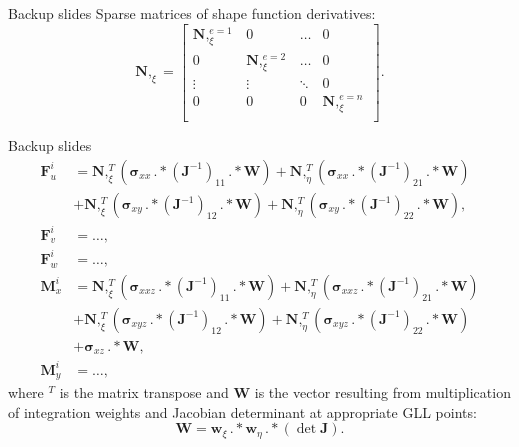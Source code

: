 \documentclass[10pt]{beamer} %
\renewcommand{\vec}[1]{\mathbf{#1}}
\newcommand{\bm}[1]{\mathbf{#1}}
\newcommand{\bs}[1]{\boldsymbol{#1}}
\begin{document}
\begin{frame}{Backup slides}
	Sparse matrices of shape function derivatives:
	\begin{equation*}
	\bm{N},_{\xi} = \left[
	\begin{array}{cccc}  
	\bm{N},_{\xi}^{e=1} & 0 & \ldots & 0\\[2pt]
	0& \bm{N},_{\xi}^{e=2}  & \ldots& 0\\[2pt]
	\vdots&\vdots&\ddots&0\\[2pt]
	0& 0 &0&\bm{N},_{\xi}^{e=n}\\[2pt]
	\end{array}\right].
	\end{equation*}
\end{frame}
\begin{frame}{Backup slides}
\begin{equation*}
\begin{split}
\vec{F}_u^i&=\bm{N},_{\xi}^T \left(\bs{\sigma}_{xx}\,.*(\vec{J}^{-1})_{11}\,.*\vec{W}\right)+\bm{N},_{\eta}^T \left(\bs{\sigma}_{xx}\,.*(\vec{J}^{-1})_{21}\,.*\vec{W}\right)\\
&+\bm{N},_{\xi}^T \left(\bs{\sigma}_{xy}\,.*(\vec{J}^{-1})_{12}\,.*\vec{W}\right)+\bm{N},_{\eta}^T \left(\bs{\sigma}_{xy}\,.*(\vec{J}^{-1})_{22}\,.*\vec{W}\right), \\ 
\vec{F}_v^i&=\ldots ,\\
\vec{F}_w^i&=\ldots ,\\
\vec{M}_x^i&=\bm{N},_{\xi}^T \left(\bs{\sigma}_{xxz}\,.*(\vec{J}^{-1})_{11}\,.*\vec{W}\right)+\bm{N},_{\eta}^T \left(\bs{\sigma}_{xxz}\,.*(\vec{J}^{-1})_{21}\,.*\vec{W}\right)\\
&+\bm{N},_{\xi}^T \left(\bs{\sigma}_{xyz}\,.*(\vec{J}^{-1})_{12}\,.*\vec{W}\right)+\bm{N},_{\eta}^T \left(\bs{\sigma}_{xyz}\,.*(\vec{J}^{-1})_{22}\,.*\vec{W}\right)\\
&+\bs{\sigma}_{xz}\,.*\vec{W},\\
\vec{M}_y^i&=\ldots ,
\label{eq:internal_forces}
\end{split}
\end{equation*}
where $^T$ is the matrix transpose and $\vec{W}$ is the vector resulting from multiplication of integration weights and Jacobian determinant at appropriate GLL points:
\begin{equation*}
\vec{W} = \vec{w}_{\xi}\,.*\vec{w}_{\eta}\,.*\left(\det\vec{J}\right).
\end{equation*}
\end{frame}
\end{document}

